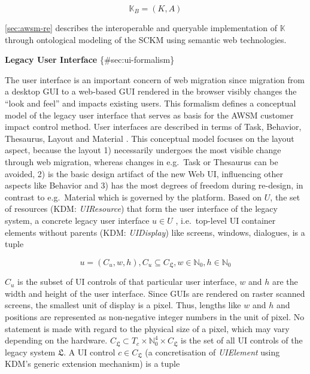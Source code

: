 \begin{equation}\mathbb{K}_{B} = (K, A)\label{eq:knowledgebase}\end{equation}

\cref{sec:awsm-re} describes the interoperable and queryable implementation of \(\mathbb{K}\) through ontological modeling of the SCKM using semantic web technologies.

\textbf{Legacy User Interface} \{\#sec:ui-formalism\}

The user interface is an important concern of web migration since migration from a desktop GUI to a web-based GUI rendered in the browser visibly changes the ``look and feel'' \autocite{Rodriguez-Echeverria2012MIGRARIA,Lucia2008,Distante2002} and impacts existing users.
This formalism defines a conceptual model of the legacy user interface that serves as basis for the AWSM customer impact control method.
User interfaces are described in terms of Task, Behavior, Thesaurus, Layout and Material \autocite{Bakaev2017Kansei}.
This conceptual model focuses on the layout aspect, because the layout 1) necessarily undergoes the most visible change through web migration, whereas changes in e.g.~Task or Thesaurus can be avoided, 2) is the basic design artifact of the new Web UI, influencing other aspects like Behavior and 3) has the most degrees of freedom during re-design, in contrast to e.g.~Material which is governed by the platform.
Based on \(U\), the set of resources (KDM: \emph{UIResource}) that form the user interface of the legacy system, a concrete legacy user interface \(u \in U\) , i.e.~top-level UI container elements without parents (KDM: \emph{UIDisplay}) like screens, windows, dialogues, is a tuple

\begin{equation}u = (C_u, w, h), C_u \subseteq C_{\mathfrak{L}}, w \in \mathbb{N}_0, h \in \mathbb{N}_0\label{eq:ui}\end{equation}

\(C_u \) is the subset of UI controls of that particular user interface, \(w\) and \(h\) are the width and height of the user interface.
Since GUIs are rendered on raster scanned screens, the smallest unit of display is a pixel.
Thus, lengths like \(w\) and \(h\) and positions are represented as non-negative integer numbers in the unit of pixel.
No statement is made with regard to the physical size of a pixel, which may vary depending on the hardware.
\(C_{\mathfrak{L}} \subset T_c \times \mathbb{N}_0^4 \times C_{\mathfrak{L}}\) is the set of all UI controls of the legacy system \(\mathfrak{L}\).
A UI control \(c \in C_{\mathfrak{L}}\) (a concretisation of \emph{UIElement} using KDM's generic extension mechanism) is a tuple

